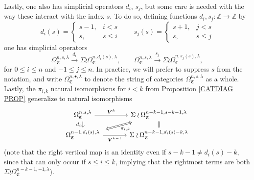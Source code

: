 \documentclass[a4paper,10pt
,draft
]{article}%
\numberwithin{equation}{section}
\numberwithin{figure}{section}
\theoremstyle{definition} %
\newcommand{\1}{\ensuremath{\mathbbm 1}}%
\begin{document}
Lastly, one also has simplicial operators $d_i$, $s_j$, 
but some care is needed with the way these interact with the index $s$. To do so, defining functions $d_i,s_j\colon \mathbb{Z} \to \mathbb{Z}$ by
\begin{equation}\label{SIMPLEXP EQ}
d_i(s) = 
\begin{cases}
s-1, & i<s
\\
s, & s\leq i
\end{cases}
\qquad
s_j(s) = 
\begin{cases}
s+1, & j<s
\\
s, & s\leq j
\end{cases}
\end{equation}
one has simplicial operators
\[
\Omega_{\mathfrak{C}}^{n,s,\lambda} \xrightarrow{d_i} \Sigma \wr\Omega_{\mathfrak{C}}^{n,d_i(s),\lambda},
\qquad
\Omega_{\mathfrak{C}}^{n,s,\lambda} \xrightarrow{s_j} \Sigma \wr\Omega_{\mathfrak{C}}^{n,s_j(s),\lambda},
\]
for $0\leq i \leq n$ and $-1\leq j \leq n$.
In practice, we will prefer to suppress $s$ from the notation,
and write 
$\Omega_{\mathfrak{C}}^{n,\bullet,\lambda}$ to denote the string of categories 
$\Omega_{\mathfrak{C}}^{n,s,\lambda}$ as a whole.
Lastly, the $\pi_{i,k}$ natural isomorphisms for $i<k$ from Proposition \ref{CATDIAG PROP}
generalize to natural isomorphisms
\begin{equation}
\begin{tikzcd}[row sep = tiny, column sep = 35pt]
\Omega_{\mathfrak{C}}^{n,s,\lambda}
\arrow{r}{\boldsymbol{V}^k} \arrow{dd}[swap]{d_i} &
|[alias=U]|
\Sigma \wr \Omega_{\mathfrak{C}}^{n-k-1,s-k-1,\lambda}
\ar[equal]{dd}{}
\\
\\
|[alias=V]|
\Omega_{\mathfrak{C}}^{n-1,d_i(s),\lambda} \arrow{r}[swap]{\boldsymbol{V}^{k-1}} &
\Sigma \wr \Omega_{\mathfrak{C}}^{n-k-1,d_i(s)-k,\lambda}
\arrow[Leftrightarrow, from=V, to=U,shorten >=0.15cm,shorten <=0.15cm
,swap,"\pi_{i,k}"
]
\end{tikzcd}
\end{equation}
(note that the right vertical map is an identity even if
$s-k-1 \neq d_i(s)-k$, since that can only occur if $s\leq i \leq k$, implying that the rightmost terms are both $\Sigma \wr \Omega_{\mathfrak{C}}^{n-k-1,-1,\lambda}$).
\end{document}
